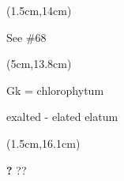 \documentclass[a4paper,10pt]{article}
\begin{document}
\begin{textblock*}{5cm}(1.5cm,14cm)%
	\begin{minipage}{5cm} 
        \small
        \color{red}
        See \#68
	\end{minipage}%
\end{textblock*}%

\begin{textblock*}{5cm}(5cm,13.8cm)%
	\begin{minipage}{5cm} 
        \footnotesize
        \color{red}
        Gk = {} chlorophytum\par
        \vspace{0.2cm}
        exalted - elated elatum
	\end{minipage}%
\end{textblock*}%

\begin{textblock*}{5cm}(1.5cm,16.1cm)%
    \begin{minipage}{5cm} 
        \large
        \color{red}
        \textbf{?}
        \color{blue}
        ??
    \end{minipage}%
\end{textblock*}%
\end{document}
